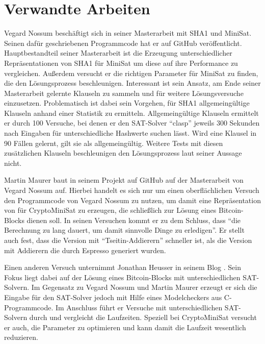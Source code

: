 \section{Verwandte Arbeiten}
\label{sec:otherwork}

Vegard Nossum beschäftigt sich in seiner Masterarbeit \cite{vegard:1} mit SHA1 und MiniSat.
Seinen dafür geschriebenen Programmcode hat er auf GitHub \cite{vegard:2} veröffentlicht.
Hauptbestandteil seiner Masterarbeit ist die Erzeugung unterschiedlicher Repräsentationen von SHA1 für
MiniSat um diese auf ihre Performance zu vergleichen. Außerdem versucht er die richtigen Parameter für
MiniSat zu finden, die den Lösungsprozess beschleunigen. Interessant ist sein Ansatz, am Ende seiner
Masterarbeit gelernte Klauseln zu sammeln und für weitere Lösungsversuche einzusetzen. Problematisch
ist dabei sein Vorgehen, für SHA1 allgemeingültige Klauseln anhand einer Statistik zu ermitteln.
Allgemeingültige Klauseln ermittelt er durch 100 Versuche, bei denen er den SAT-Solver "`clasp"'
jeweils 300 Sekunden nach Eingaben für unterschiedliche Hashwerte suchen lässt. Wird eine Klausel
in 90 Fällen gelernt, gilt sie als allgemeingültig. Weitere Tests mit diesen zusätzlichen Klauseln
beschleunigen den Lösungsprozess laut seiner Aussage nicht.

Martin Maurer baut in seinem Projekt auf GitHub \cite{capiman} auf der Masterarbeit von Vegard Nossum auf.
Hierbei handelt es sich nur um einen oberflächlichen Versuch den Programmcode von Vegard Nossum zu nutzen,
um damit eine Repräsentation von  für CryptoMiniSat zu erzeugen, die schließlich zur Lösung eines
Bitcoin-Blocks dienen soll. In seinen Versuchen kommt er zu dem Schluss, dass "`die Berechnung zu lang dauert,
um damit sinnvolle Dinge zu erledigen"'. Er stellt auch fest, dass die Version mit "`Tseitin-Addierern"'
schneller ist, als die Version mit Addierern die durch Espresso generiert wurden.

Einen anderen Versuch unternimmt Jonathan Heusser in seinem Blog \cite{jona:1}. Sein Fokus liegt dabei
auf der Lösung eines Bitcoin-Blocks mit unterschiedlichen SAT-Solvern. Im Gegensatz zu Vegard Nossum und
Martin Maurer erzeugt er sich die Eingabe für den SAT-Solver jedoch mit Hilfe eines Modelcheckers aus
C-Programmcode. Im Anschluss führt er Versuche mit unterschiedlichen SAT-Solvern durch und vergleicht die
Laufzeiten. Speziell bei CryptoMiniSat versucht er auch, die Parameter zu optimieren und kann damit die
Laufzeit wesentlich reduzieren.